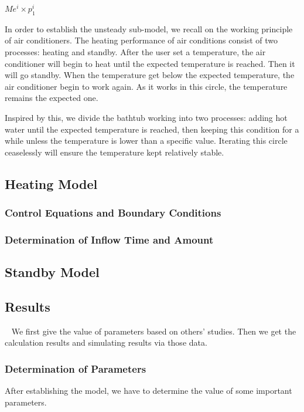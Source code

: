\documentclass{mcmthesis}
\begin{document}
$Me^{i}\times p_{1}^{i}$

In order to establish the unsteady sub-model, we recall on the working principle of air conditioners. The heating performance of air conditions consist of two processes: heating and standby. After the user set a temperature, the air conditioner will begin to heat until the expected temperature is reached. Then it will go standby. When the temperature get below the expected temperature, the air conditioner begin to work again. As it works in this circle, the temperature remains the expected one.

Inspired by this, we divide the bathtub working into two processes: adding
hot water until the expected temperature is reached, then keeping this
condition for a while unless the temperature is lower than a specific value. Iterating this circle ceaselessly will ensure the temperature kept relatively stable.

\subsection{Heating Model}

\subsubsection{Control Equations and Boundary Conditions}

\subsubsection{Determination of Inflow Time and Amount}

\subsection{Standby Model}

\subsection{Results}

\quad~ We first give the value of parameters based on others’ studies. Then we get the calculation results and simulating results via those data.

\subsubsection{Determination of Parameters}

After establishing the model, we have to determine the value of some
important parameters.
\end{document}
